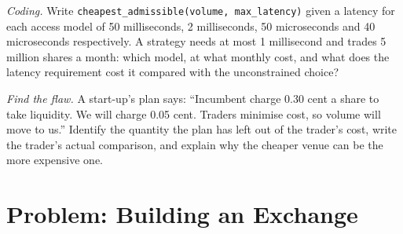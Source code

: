 \begin{exercise}[$\star\star\star$]\label{exo:m1:exchanges-brokers-venues:7}
\emph{Coding.} Write \texttt{cheapest\_admissible(volume, max\_latency)}
given a latency for each access model of 50 milliseconds, 2 milliseconds,
50 microseconds and 40 microseconds respectively. A strategy needs at most
1 millisecond and trades 5 million shares a month: which model, at what
monthly cost, and what does the latency requirement cost it compared with
the unconstrained choice?
\end{exercise}

\begin{exercise}[$\star\star\star$]\label{exo:m1:exchanges-brokers-venues:8}
\emph{Find the flaw.} A start-up's plan says: ``Incumbent  charge
0.30 cent a share to take liquidity. We will charge 0.05 cent. Traders
minimise cost, so volume will move to us.'' Identify the quantity the plan
has left out of the trader's cost, write the trader's actual comparison, and
explain why the cheaper venue can be the more expensive one.
\end{exercise}

\section{Problem: Building an Exchange}

